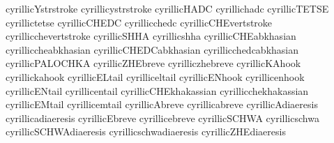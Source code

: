  cyrillicYstrstroke         {}
 cyrillicystrstroke         {}
 cyrillicHADC               {}
 cyrillichadc               {}
 cyrillicTETSE              {}
 cyrillictetse              {}
 cyrillicCHEDC              {}
 cyrillicchedc              {}
 cyrillicCHEvertstroke      {}
 cyrillicchevertstroke      {}
 cyrillicSHHA               {}
 cyrillicshha               {}
 cyrillicCHEabkhasian       {}
 cyrilliccheabkhasian       {}
 cyrillicCHEDCabkhasian     {}
 cyrillicchedcabkhasian     {}
 cyrillicPALOCHKA           {}
 cyrillicZHEbreve           {}
 cyrilliczhebreve           {}
 cyrillicKAhook             {}
 cyrillickahook             {}
 cyrillicELtail             {}
 cyrilliceltail             {}
 cyrillicENhook             {}
 cyrillicenhook             {}
 cyrillicENtail             {}
 cyrillicentail             {}
 cyrillicCHEkhakassian      {}
 cyrillicchekhakassian      {}
 cyrillicEMtail             {}
 cyrillicemtail             {}
 cyrillicAbreve             {}
 cyrillicabreve             {}
 cyrillicAdiaeresis         {}
 cyrillicadiaeresis         {}
 cyrillicEbreve             {}
 cyrillicebreve             {}
 cyrillicSCHWA              {}
 cyrillicschwa              {}
 cyrillicSCHWAdiaeresis     {}
 cyrillicschwadiaeresis     {}
 cyrillicZHEdiaeresis       {}
